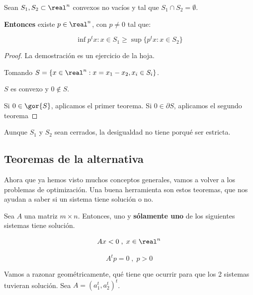\begin{theorem}

Sean $S_1,S_2\subset \real^n$ convexos no vacíos y tal que $S_1\cap S_2  =\emptyset$.

\textbf{Entonces} existe $p\in\real^n$, con $p≠0$ tal que:

\[
\inf{p^tx: x\in S_1} \geq \sup\{p^tx : x\in S_2\}
\]

\end{theorem}

\begin{proof}
La demostración es un ejercicio de la hoja.

Tomando $S = \{x\in\real^n: x = x_1 - x_2, x_i \in S_i\}$.

$S$ es convexo y $0 \not\in S$.

Si $0\in\gor{S}$, aplicamos el primer teorema. Si $0\in\partial{S}$, aplicamos el segundo teorema
\end{proof}


\obs Aunque $S_1$ y $S_2$ sean cerrados, la desigualdad no tiene porqué ser estricta.




\subsection{Teoremas de la alternativa}

Ahora que ya hemos visto muchos conceptos generales, vamos a volver a los problemas de optimización.
Una buena herramienta son estos teoremas, que nos ayudan a saber si un sistema tiene solución o no.

\begin{lemma}
Sea $A$ una matriz $m\times n$. Entonces, uno y \textbf{sólamente uno} de los siguientes sistemas tiene solución.

\begin{equation}
Ax < 0\;,\; x\in\real^n
\label{eq:Gordan_1}
\end{equation}

\begin{equation}
A^tp = 0\;,\; p > 0
\label{eq:Gordan_2}
\end{equation}
\end{lemma}


Vamos a razonar geométricamente, qué tiene que ocurrir para que los 2 sistemas tuvieran solución. Sea $A = (a_1^t,a_2^t)^t$.

\begin{figure}[h]
\centering
{}
\end{figure}

